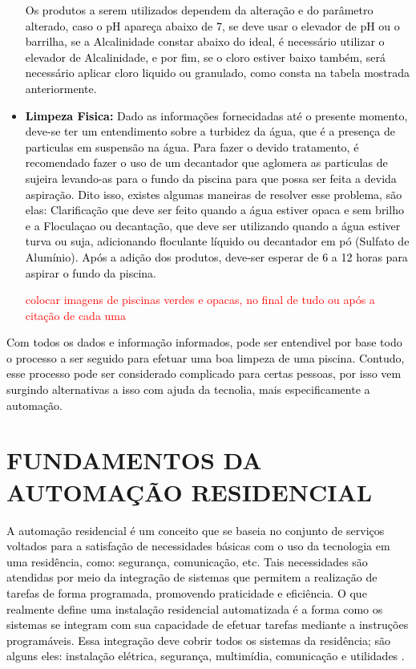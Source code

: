 \begin{itemize}
            \textcolor{black}{Os produtos a serem utilizados dependem da alteração e do parâmetro alterado, caso o pH apareça abaixo de 7, se deve usar o elevador de pH ou o barrilha, se a Alcalinidade constar abaixo do ideal, é necessário utilizar o elevador de Alcalinidade, e por fim, se o cloro estiver baixo também, será necessário aplicar cloro liquido ou granulado, como consta na tabela mostrada anteriormente.}


            \item \textbf{\textcolor{black}{Limpeza Fisica:}} \textcolor{black}{Dado as informações fornecidadas até o presente momento, deve-se ter um entendimento sobre a turbidez da água, que é a presença de particulas em suspensão na água. Para fazer o devido tratamento, é recomendado fazer o uso de um decantador que aglomera as particulas de sujeira levando-as para o fundo da piscina para que possa ser feita a devida aspiração. Dito isso, existes algumas maneiras de resolver esse problema, são elas: Clarificação que deve ser feito quando a água estiver opaca e sem brilho e a Floculaçao ou decantação, que deve ser utilizando quando a água estiver turva ou suja, adicionando floculante líquido ou decantador em pó (Sulfato de Alumínio). Após a adição dos produtos, deve-ser esperar de 6 a 12 horas para aspirar o fundo da piscina.}

            \textcolor{red}{colocar imagens de piscinas verdes e opacas, no final de tudo ou após a citação de cada uma}
            
        \end{itemize}

        \textcolor{black}{Com todos os dados e informação informados, pode ser entendivel por base todo o processo a ser seguido para efetuar uma boa limpeza de uma piscina. Contudo, esse processo pode ser considerado complicado para certas pessoas, por isso vem surgindo alternativas a isso com ajuda da tecnolia, mais especificamente a automação.}
         
   
\section{FUNDAMENTOS DA AUTOMAÇÃO RESIDENCIAL}
    \textcolor{black}{A automação residencial é um conceito que se baseia no conjunto de serviços voltados para a satisfação de necessidades básicas com o uso da tecnologia em uma residência, como: segurança, comunicação, etc. Tais necessidades são atendidas por meio da integração de sistemas que permitem a realização de tarefas de forma programada, promovendo praticidade e eficiência. O que realmente define uma instalação residencial automatizada é a forma como os sistemas se integram com sua capacidade de efetuar tarefas mediante a instruções programáveis. Essa integração deve cobrir todos os sistemas da residência; são alguns eles: instalação elétrica, segurança, multimídia, comunicação e utilidades \cite{automacaoResidencialCap1}.}

